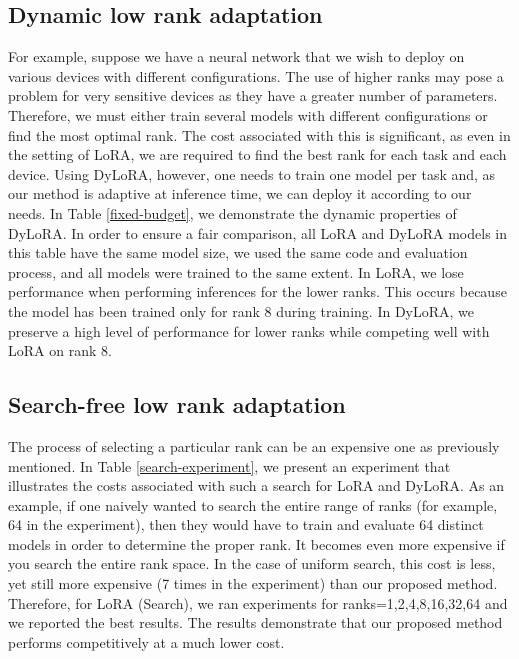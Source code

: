 \subsection{Dynamic low rank adaptation} 

For example, suppose we have a neural network that we wish to deploy on various devices with different configurations. The use of higher ranks may pose a problem for very sensitive devices as they have a greater number of parameters. Therefore, we must either train several models with different configurations or find the most optimal rank. The cost associated with this is significant, as even in the setting of LoRA, we are required to find the best rank for each task and each device. Using DyLoRA, however, one needs to train one model per task and, as our method is adaptive at inference time, we can deploy it according to our needs. In Table \ref{fixed-budget}, we demonstrate the dynamic properties of DyLoRA. In order to ensure a fair comparison, all LoRA and DyLoRA models in this table have the same model size,  we used the same code and evaluation process, and all models were trained to the same extent. In LoRA, we lose performance when performing inferences for the lower ranks. This occurs because the model has been trained only for rank 8 during training. In DyLoRA, we preserve a high level of performance for lower ranks while competing well with LoRA on rank 8.

\subsection{Search-free low rank adaptation} 

The process of selecting a particular rank can be an expensive one as previously mentioned. In Table \ref{search-experiment}, we present an experiment that illustrates the costs associated with such a search for LoRA and DyLoRA. As an example, if one naively wanted to search the entire range of ranks (for example, 64 in the experiment), then they would have to train and evaluate 64 distinct models in order to determine the proper rank. It becomes even more expensive if you search the entire rank space. In the case of uniform search, this cost is less, yet still more expensive (7 times in the experiment) than our proposed method. Therefore, for LoRA (Search), we ran experiments for ranks={1,2,4,8,16,32,64} and we reported the best results. The results demonstrate that our proposed method performs competitively at a much lower cost.

